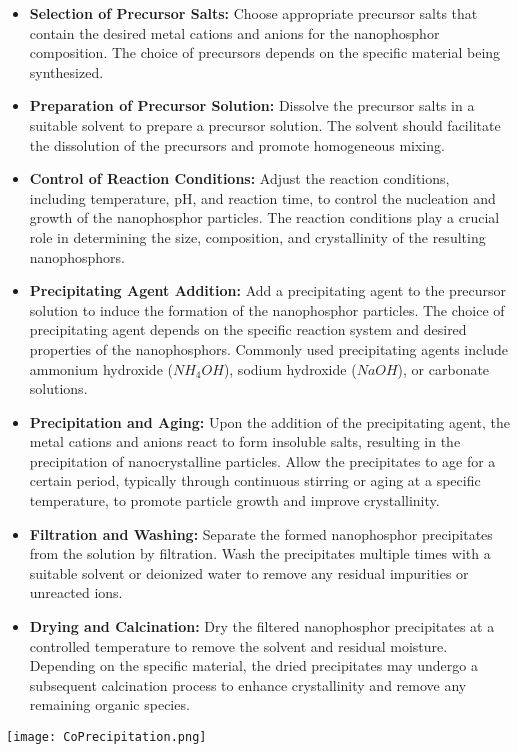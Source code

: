 \documentclass[../../Report.tex]{subfiles}
\begin{document}
        \begin{itemize}
            \item \textbf{Selection of Precursor Salts:} Choose appropriate precursor salts that contain the 
            desired metal cations and anions for the nanophosphor composition. The choice of precursors depends on 
            the specific material being synthesized.
            \item \textbf{Preparation of Precursor Solution: } Dissolve the precursor salts in a suitable solvent 
            to prepare a precursor solution. The solvent should facilitate the dissolution of the precursors and 
            promote homogeneous mixing.
            \item \textbf{Control of Reaction Conditions: }Adjust the reaction conditions, including temperature, 
            pH, and reaction time, to control the nucleation and growth of the nanophosphor particles. The 
            reaction conditions play a crucial role in determining the size, composition, and crystallinity of the 
            resulting nanophosphors.
            \item \textbf{Precipitating Agent Addition: }Add a precipitating agent to the precursor solution to 
            induce the formation of the nanophosphor particles. The choice of precipitating agent depends on the 
            specific reaction system and desired properties of the nanophosphors. Commonly used precipitating 
            agents include ammonium hydroxide ($NH_4OH$), sodium hydroxide ($NaOH$), or carbonate solutions.
            \item \textbf{Precipitation and Aging: }Upon the addition of the precipitating agent, the metal 
            cations and anions react to form insoluble salts, resulting in the precipitation of nanocrystalline 
            particles. Allow the precipitates to age for a certain period, typically through continuous stirring 
            or aging at a specific temperature, to promote particle growth and improve crystallinity.
            \item \textbf{Filtration and Washing: }Separate the formed nanophosphor precipitates from the solution 
            by filtration. Wash the precipitates multiple times with a suitable solvent or deionized water to 
            remove any residual impurities or unreacted ions.
            \item \textbf{Drying and Calcination:} Dry the filtered nanophosphor precipitates at a controlled 
            temperature to remove the solvent and residual moisture. Depending on the specific material, the dried 
            precipitates may undergo a subsequent calcination process to enhance crystallinity and remove any 
            remaining organic species.
        \end{itemize}
        \begin{Figure}
            \centering
            \texttt{[image: CoPrecipitation.png]}
            \label{fig:CoPrecipitation}
        \end{Figure}
        
\end{document}
